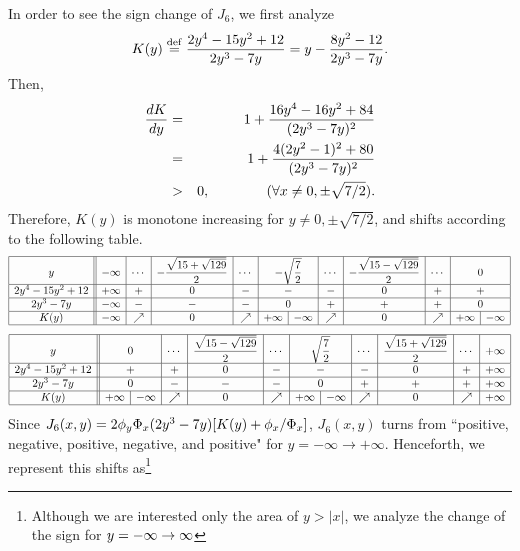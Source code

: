 In order to see the sign change of $J_6$, we first analyze
\[
 K(y) \stackrel{\mathrm{def}}{=} \frac{2y^4-15y^2+12}{2y^3-7y} = y - \frac{8y^2-12}{2y^3-7y}.
\]
Then,
\begin{eqnarray*}
  \frac{d K}{d y}
    & = & 1 + \frac{16y^4 - 16y^2 +84}{(2y^3-7y)^2} \\
    & = & 1 + \frac{4 (2y^2 - 1)^2 +80}{(2y^3-7y)^2} \\
    & > & 0, \qquad\qquad (\forall x \neq 0, \pm \sqrt{7/2}).
\end{eqnarray*}
Therefore, $K(y)$ is monotone increasing for $y \neq 0, \pm \sqrt{7/2}$, and shifts according to the following table.
\[
\begin{array}{|c||c|c|c|c|c|c|c|c|c|c|c|c|c|c|} \hline
  y & -\infty & \cdots & \multicolumn{2}{c|}{{\displaystyle -\frac{\sqrt{15+\sqrt{129}}}{2}}} & \cdots
    & \multicolumn{2}{c|}{{\displaystyle -\sqrt{\frac{7}{2}}}} & \cdots
    & \multicolumn{2}{c|}{{\displaystyle -\frac{\sqrt{15-\sqrt{129}}}{2}}} & \cdots & \multicolumn{2}{c|}{0} \\ \hline
  2y^4-15y^2+12 & +\infty & + & \multicolumn{2}{c|}{0} & - & \multicolumn{2}{c|}{-} & - & \multicolumn{2}{c|}{0} & +
    & \multicolumn{2}{c|}{+} \\ \hline
  2y^3-7y & -\infty & - & \multicolumn{2}{c|}{-} & - & \multicolumn{2}{c|}{0} & + & \multicolumn{2}{c|}{+} & +
    & \multicolumn{2}{c|}{0} \\ \hline
  K(y) & -\infty & \nearrow & \multicolumn{2}{c|}{0} & \nearrow & +\infty & -\infty & \nearrow & \multicolumn{2}{c|}{0}
    & \nearrow & +\infty & -\infty \\ \hline
\end{array}
\]
\[
\begin{array}{|c||c|c|c|c|c|c|c|c|c|c|c|c|c|c} \hline
  y & \multicolumn{2}{c|}{0} & \cdots & \multicolumn{2}{c|}{{\displaystyle \frac{\sqrt{15-\sqrt{129}}}{2}}} & \cdots
    & \multicolumn{2}{c|}{{\displaystyle \sqrt{\frac{7}{2}}}} & \cdots
    & \multicolumn{2}{c|}{{\displaystyle \frac{\sqrt{15+\sqrt{129}}}{2}}} & \cdots & +\infty \\ \hline
  2y^4-15y^2+12 & \multicolumn{2}{c|}{+} & + & \multicolumn{2}{c|}{0} & - & \multicolumn{2}{c|}{-} & -
    & \multicolumn{2}{c|}{0} & + & +\infty \\ \hline
  2y^3-7y & \multicolumn{2}{c|}{0} & - & \multicolumn{2}{c|}{-} & - & \multicolumn{2}{c|}{0} & +
    & \multicolumn{2}{c|}{+} & + & +\infty \\ \hline
  K(y) & +\infty & -\infty & \nearrow & \multicolumn{2}{c|}{0} & \nearrow & +\infty & -\infty & \nearrow
    & \multicolumn{2}{c|}{0} & \nearrow & +\infty \\ \hline
\end{array}
\]
Since $J_6(x,y)=2 \phi_y \Phi_x (2y^3-7y) [K(y) + \phi_x/\Phi_x]$, $J_6(x,y)$ turns from ``positive, negative, positive, negative, and positive" for $y=-\infty \rightarrow +\infty$.  Henceforth, we represent this shifts as\footnote{Although we are interested only the area of $y>|x|$, we analyze the change of the sign for $y=-\infty \rightarrow\infty$}

